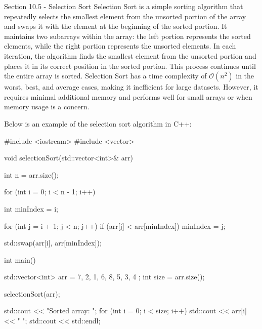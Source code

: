 \begin{notes}{Section 10.5 - Selection Sort}
    Selection Sort is a simple sorting algorithm that repeatedly selects the smallest element from the unsorted portion of the array and swaps it with the element at the beginning of the sorted portion. It maintains two subarrays within the array: the left portion represents the sorted elements, while the right portion represents the unsorted elements. 
    In each iteration, the algorithm finds the smallest element from the unsorted portion and places it in its correct position in the sorted portion. This process continues until the entire array is sorted. Selection Sort has a time complexity of $\mathcal{O}(n^2)$ in the worst, best, and average cases, making it inefficient for large datasets. However, 
    it requires minimal additional memory and performs well for small arrays or when memory usage is a concern.
    
    \begin{highlight}
        Below is an example of the selection sort algorithm in C++:
    
    \begin{code}[C++]
    #include <iostream>
    #include <vector>
    
    void selectionSort(std::vector<int>& arr) {
        int n = arr.size();
    
        for (int i = 0; i < n - 1; i++) {
            int minIndex = i;
    
            for (int j = i + 1; j < n; j++) {
                if (arr[j] < arr[minIndex]) {
                    minIndex = j;
                }
            }
    
            std::swap(arr[i], arr[minIndex]);
        }
    }
    
    int main() {
        std::vector<int> arr = { 7, 2, 1, 6, 8, 5, 3, 4 };
        int size = arr.size();
    
        selectionSort(arr);
    
        std::cout << "Sorted array: ";
        for (int i = 0; i < size; i++) {
            std::cout << arr[i] << " ";
        }
        std::cout << std::endl;
    
}
\end{code}
\end{highlight}
\end{notes}
